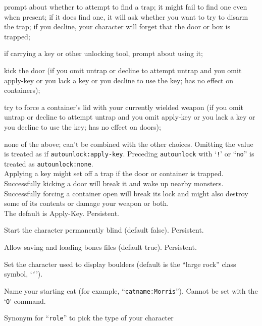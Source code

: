 \newlength{\auwidth}
\settowidth{\auwidth}{\tt Apply-Key}
\addtolength{\auwidth}{\labelsep}
\blist{\leftmargin \auwidth \topsep 1mm \itemsep 0mm}
\item[{\tt Untrap}]
prompt about whether to attempt to find a trap;
it might fail to find one even when present; if it does find one, it
will ask whether you want to try to disarm the trap; if you decline,
your character will forget that the door or box is trapped;
\item[{\tt Apply-Key}]
if carrying a key or other unlocking tool, prompt about using it;
\item[{\tt Kick}]
kick the door (if you omit untrap or decline to attempt untrap and
you omit apply-key or you lack a key or you decline to use the key;
has no effect on containers);
\item[{\tt Force}]
try to force a container's lid with your currently
wielded weapon (if you omit untrap or decline to attempt untrap and
you omit apply-key or you lack a key or you decline to use the key;
has no effect on doors);
\item[{\tt None}]
none of the above; can't be combined with the other choices.
\elist
Omitting the value is treated as if {\tt autounlock:apply-key}.
Preceding {\tt autounlock} with `{\tt !}' or ``{\tt no}'' is treated as
{\tt autounlock:none}.
\\
Applying a key might set off a trap if the door or container is trapped.
Successfully kicking a door will break it and wake up nearby monsters.
Successfully forcing a container open will break its lock and might also
destroy some of its contents or damage your weapon or both.
\\
The default is Apply-Key.
Persistent.
\item[\ib{blind}]
Start the character permanently blind (default false).  Persistent.
\item[\ib{bones}]
Allow saving and loading bones files (default true).  Persistent.
\item[\ib{boulder}]
Set the character used to display boulders (default is the ``large rock''
class symbol, `{\tt `}').
\item[\ib{catname}]
Name your starting cat (for example, ``{\tt catname:Morris}'').
Cannot be set with the `{\tt O}' command.
\item[\ib{character}]
Synonym for ``{\tt role}'' to pick the type of your character
